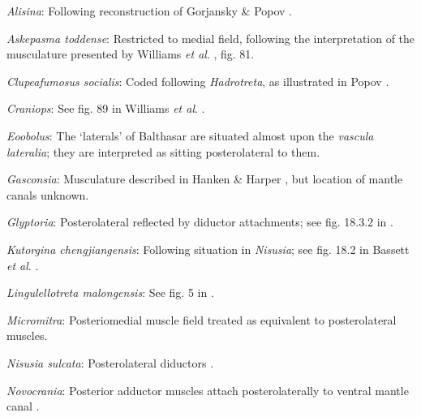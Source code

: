 \documentclass[openany]{book}
\begin{document}
\hypertarget{Alisina-coding-82}{}
\emph{Alisina}: Following reconstruction of Gorjansky \& Popov
\citeyearpar{Gorjansky1986Onthe}.

\hypertarget{Askepasma_toddense-coding-82}{}
\emph{Askepasma toddense}: Restricted to medial field, following the
interpretation of the musculature presented by Williams \emph{et al}.
\citeyearpar{Williams2000LinguliformeaCraniiformea}, fig. 81.

\hypertarget{Clupeafumosus_socialis-coding-82}{}
\emph{Clupeafumosus socialis}: Coded following \emph{Hadrotreta}, as
illustrated in Popov \citeyearpar{Popov1992TheCambrian}.

\hypertarget{Craniops-coding-82}{}
\emph{Craniops}: See fig. 89 in Williams \emph{et al}.
\citeyearpar{Williams2000LinguliformeaCraniiformea}.

\hypertarget{Eoobolus-coding-82}{}
\emph{Eoobolus}: The `laterals' of Balthasar \citeyearpar[fig.
5]{Balthasar2009Thebrachiopod} are situated almost upon the
\emph{vascula} \emph{lateralia}; they are interpreted as sitting
posterolateral to them.

\hypertarget{Gasconsia-coding-82}{}
\emph{Gasconsia}: Musculature described in Hanken \& Harper
\citeyearpar{Hanken1985Thetaxonomy}, but location of mantle canals
unknown.

\hypertarget{Glyptoria-coding-82}{}
\emph{Glyptoria}: Posterolateral reflected by diductor attachments; see
fig. 18.3.2 in \citet{Bassett2001Functionalmorphology}.

\hypertarget{Kutorgina_chengjiangensis-coding-82}{}
\emph{Kutorgina chengjiangensis}: Following situation in \emph{Nisusia};
see fig. 18.2 in Bassett \emph{et al}.
\citeyearpar{Bassett2001Functionalmorphology}.

\hypertarget{Lingulellotreta_malongensis-coding-82}{}
\emph{Lingulellotreta malongensis}: See fig. 5 in
\citet{Holmer1997EarlyCambrian}.

\hypertarget{Micromitra-coding-82}{}
\emph{Micromitra}: Posteriomedial muscle field \citep[text-fig.
6]{Williams1998Thediversity} treated as equivalent to posterolateral
muscles.

\hypertarget{Nisusia_sulcata-coding-82}{}
\emph{Nisusia sulcata}: Posterolateral diductors \citep[fig. 18.2
in][]{Bassett2001Functionalmorphology}.

\hypertarget{Novocrania-coding-82}{}
\emph{Novocrania}: Posterior adductor muscles attach posterolaterally to
ventral mantle canal \citep{Robinson2014Themuscles}.
\end{document}
